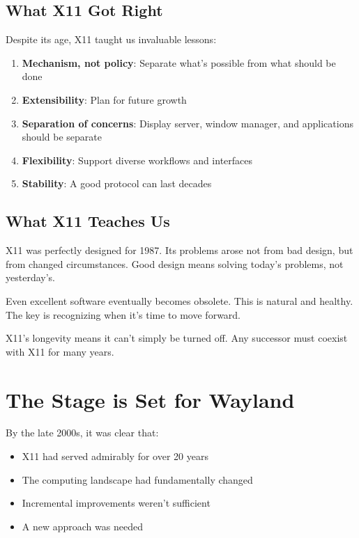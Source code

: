 \subsection{What X11 Got Right}

Despite its age, X11 taught us invaluable lessons:

\begin{enumerate}[leftmargin=*]
    \item \textbf{Mechanism, not policy}: Separate what's possible from what should be done
    \item \textbf{Extensibility}: Plan for future growth
    \item \textbf{Separation of concerns}: Display server, window manager, and applications should be separate
    \item \textbf{Flexibility}: Support diverse workflows and interfaces
    \item \textbf{Stability}: A good protocol can last decades
\end{enumerate}

\subsection{What X11 Teaches Us}

\begin{principle}
X11 was perfectly designed for 1987. Its problems arose not from bad design, but from changed circumstances. Good design means solving today's problems, not yesterday's.
\end{principle}

\begin{principle}
Even excellent software eventually becomes obsolete. This is natural and healthy. The key is recognizing when it's time to move forward.
\end{principle}

\begin{principle}
X11's longevity means it can't simply be turned off. Any successor must coexist with X11 for many years.
\end{principle}

\section{The Stage is Set for Wayland}

By the late 2000s, it was clear that:

\begin{itemize}[leftmargin=*]
    \item X11 had served admirably for over 20 years
    \item The computing landscape had fundamentally changed
    \item Incremental improvements weren't sufficient
    \item A new approach was needed
\end{itemize}

